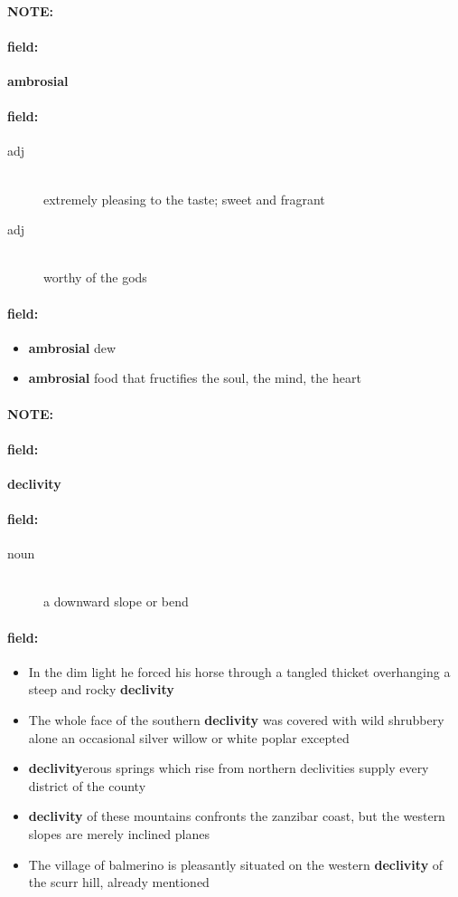 \documentclass[12pt]{article}
\newenvironment{note}{\paragraph{NOTE:}}{}
\newenvironment{field}{\paragraph{field:}}{}
\begin{document}
\begin{note}
\begin{field}
\textbf{\large ambrosial}
\end{field}


\begin{field}
\begin{description}
\item[adj] \hfill \\ 
extremely pleasing to the taste; sweet and fragrant

\item[adj] \hfill \\ 
worthy of the gods

\end{description}
\end{field}

\begin{field}
\begin{itemize}
\item \textbf{ambrosial} dew
\item \textbf{ambrosial} food that fructifies the soul, the mind, the heart
\end{itemize}
\end{field}
\end{note}
\begin{note}
\begin{field}
\textbf{\large declivity}
\end{field}


\begin{field}
\begin{description}
\item[noun] \hfill \\ 
a downward slope or bend

\end{description}
\end{field}

\begin{field}
\begin{itemize}
\item In the dim light he forced his horse through a tangled thicket overhanging a steep and rocky \textbf{declivity}
\item The whole face of the southern \textbf{declivity} was covered with wild shrubbery alone  an occasional silver willow or white poplar excepted
\item \textbf{declivity}erous springs which rise from northern declivities supply every district of the county
\item \textbf{declivity} of these mountains confronts the zanzibar coast, but the western slopes are merely inclined planes
\item The village of balmerino is pleasantly situated on the western \textbf{declivity} of the scurr hill, already mentioned
\end{itemize}
\end{field}
\end{note}
\end{document}
